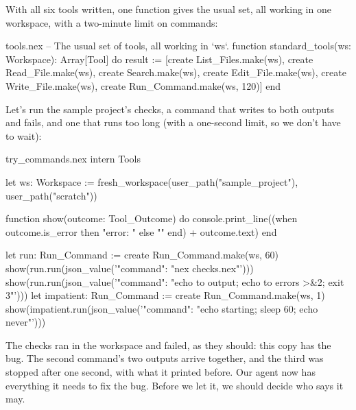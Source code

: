 With all six tools written, one function gives the usual set, all working
in one workspace, with a two-minute limit on commands:

\begin{append}{tools.nex}
-- The usual set of tools, all working in `ws`.
function standard_tools(ws: Workspace): Array[Tool] do
  result := [create List_Files.make(ws), create Read_File.make(ws),
    create Search.make(ws), create Edit_File.make(ws),
    create Write_File.make(ws), create Run_Command.make(ws, 120)]
end
\end{append}

Let's run the sample project's checks, a command that writes to both
outputs and fails, and one that runs too long (with a one-second limit, so
we don't have to wait):

\begin{tryit}{try_commands.nex}
intern Tools

let ws: Workspace := fresh_workspace(user_path("sample_project"), user_path("scratch"))

function show(outcome: Tool_Outcome) do
  console.print_line((when outcome.is_error then "error: " else "" end) + outcome.text)
end

let run: Run_Command := create Run_Command.make(ws, 60)
show(run.run(json_value('{"command": "nex checks.nex"}')))
show(run.run(json_value('{"command": "echo to output; echo to errors >&2; exit 3"}')))
let impatient: Run_Command := create Run_Command.make(ws, 1)
show(impatient.run(json_value('{"command": "echo starting; sleep 60; echo never"}')))
\end{tryit}

The checks ran in the workspace and failed, as they should: this copy has
the bug. The second command's two outputs arrive together, and the third
was stopped after one second, with what it printed before. Our agent now
has everything it needs to fix the bug. Before we let it, we should decide
who says it may.
